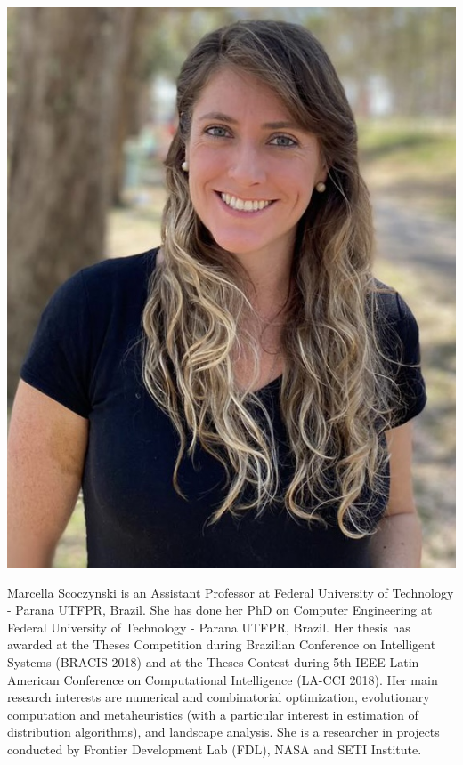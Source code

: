 \begin{center}
\includegraphics[width=.3\textwidth]{Photos/mar2022.jpg}
\end{center}

Marcella Scoczynski is an Assistant Professor at Federal University of Technology - Parana UTFPR, Brazil. She has done her PhD on Computer Engineering at Federal University of Technology - Parana UTFPR, Brazil. Her thesis has awarded at the Theses Competition during Brazilian Conference on Intelligent Systems (BRACIS 2018) and at the Theses Contest during 5th IEEE Latin American Conference on Computational Intelligence (LA-CCI 2018). Her main research interests are numerical and combinatorial optimization, evolutionary computation and metaheuristics (with a particular interest in estimation of distribution algorithms), and landscape analysis. She is a researcher in projects conducted by Frontier Development Lab (FDL), NASA and SETI Institute. 


